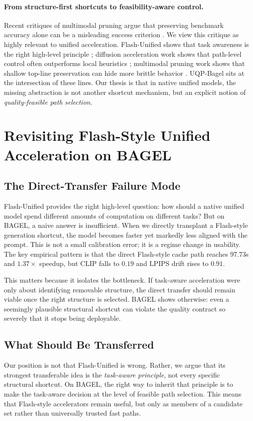 \documentclass{article}
\begin{document}
\paragraph{From structure-first shortcuts to feasibility-aware control.} Recent critiques of multimodal pruning argue that preserving benchmark accuracy alone can be a misleading success criterion \citep{tokenpruning}. We view this critique as highly relevant to unified acceleration. Flash-Unified shows that task awareness is the right high-level principle \citep{flash}; diffusion acceleration work shows that path-level control often outperforms local heuristics \citep{dpcache,teacache,pab}; multimodal pruning work shows that shallow top-line preservation can hide more brittle behavior \citep{tokenpruning,fastv,sparsevlm}. UQP-Bagel sits at the intersection of these lines. Our thesis is that in native unified models, the missing abstraction is not another shortcut mechanism, but an explicit notion of \emph{quality-feasible path selection}.
\section{Revisiting Flash-Style Unified Acceleration on BAGEL}
\subsection{The Direct-Transfer Failure Mode}
Flash-Unified provides the right high-level question: how should a native unified model spend different amounts of computation on different tasks? But on BAGEL, a naive answer is insufficient. When we directly transplant a Flash-style generation shortcut, the model becomes faster yet markedly less aligned with the prompt. This is not a small calibration error; it is a regime change in usability. The key empirical pattern is that the direct Flash-style cache path reaches $97.73$s and $1.37\times$ speedup, but CLIP falls to $0.19$ and LPIPS drift rises to $0.91$.

This matters because it isolates the bottleneck. If task-aware acceleration were only about identifying removable structure, the direct transfer should remain viable once the right structure is selected. BAGEL shows otherwise: even a seemingly plausible structural shortcut can violate the quality contract so severely that it stops being deployable.

\subsection{What Should Be Transferred}
Our position is not that Flash-Unified is wrong. Rather, we argue that its strongest transferable idea is the \emph{task-aware principle}, not every specific structural shortcut. On BAGEL, the right way to inherit that principle is to make the task-aware decision at the level of feasible path selection. This means that Flash-style accelerators remain useful, but only as members of a candidate set rather than universally trusted fast paths.
\end{document}
